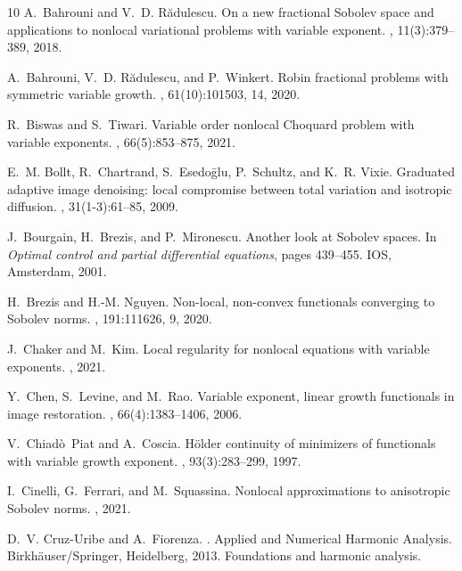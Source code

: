 \documentclass[11pt]{amsart}
\theoremstyle{plain}
\theoremstyle{definition}
\numberwithin{equation}{section}
\begin{document}
\begin{thebibliography}{10}
A.~Bahrouni and V.~D. R\u{a}dulescu.
\newblock On a new fractional {S}obolev space and applications to nonlocal
  variational problems with variable exponent.
, 11(3):379--389, 2018.

A.~Bahrouni, V.~D. R\u{a}dulescu, and P.~Winkert.
\newblock Robin fractional problems with symmetric variable growth.
, 61(10):101503, 14, 2020.

R.~Biswas and S.~Tiwari.
\newblock Variable order nonlocal {C}hoquard problem with variable exponents.
, 66(5):853--875, 2021.

E.~M. Bollt, R.~Chartrand, S.~Esedo\={g}lu, P.~Schultz, and K.~R. Vixie.
\newblock Graduated adaptive image denoising: local compromise between total
  variation and isotropic diffusion.
, 31(1-3):61--85, 2009.

J.~Bourgain, H.~Brezis, and P.~Mironescu.
\newblock Another look at {S}obolev spaces.
\newblock In {\em Optimal control and partial differential equations}, pages
  439--455. IOS, Amsterdam, 2001.

H.~Brezis and H.-M. Nguyen.
\newblock Non-local, non-convex functionals converging to {S}obolev norms.
, 191:111626, 9, 2020.

J.~Chaker and M.~Kim.
\newblock Local regularity for nonlocal equations with variable exponents.
, 2021.

Y.~Chen, S.~Levine, and M.~Rao.
\newblock Variable exponent, linear growth functionals in image restoration.
, 66(4):1383--1406, 2006.

V.~Chiad\`o~Piat and A.~Coscia.
\newblock H\"{o}lder continuity of minimizers of functionals with variable
  growth exponent.
, 93(3):283--299, 1997.

I.~Cinelli, G.~Ferrari, and M.~Squassina.
\newblock Nonlocal approximations to anisotropic {S}obolev norms.
, 2021.

D.~V. Cruz-Uribe and A.~Fiorenza.
.
\newblock Applied and Numerical Harmonic Analysis. Birkh\"{a}user/Springer,
  Heidelberg, 2013.
\newblock Foundations and harmonic analysis.


\end{thebibliography}
\end{document}
